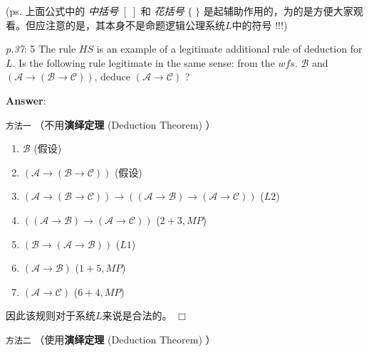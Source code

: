 \documentclass[UTF8,12pt,a4paper]{ctexart}
\begin{document}
\vspace{1em}

(ps. 上面公式中的 \textit{中括号} $[ \;]$ 和 \textit{花括号} $\{ \; \}$ 是起辅助作用的，为的是方便大家观看。但应注意的是，其本身不是命题逻辑公理系统$L$中的符号 !!!)

\vspace{2em}

\emph{p.37}: 5 \quad
The rule $HS$ is an example of a legitimate additional rule of deduction for $L$. Is the following rule legitimate in the same sense: from the $wfs.$ $\mathscr{B}$ and $(\mathscr{A} \to (\mathscr{B} \to \mathscr{C}))$, deduce $(\mathscr{A} \to \mathscr{C})$ ?

\noindent\textbf{Answer}:   

\noindent\texttt{方法一} （不用\textbf{演绎定理}  (Deduction Theorem) ）

\begin{enumerate}
	\item $\mathscr{B}$
	\hfill (假设)
	
	\item $(\mathscr{A} \to (\mathscr{B} \to \mathscr{C}))$
	\hfill (假设)
	
	
	\item $(\mathscr{A} \to (\mathscr{B} \to \mathscr{C})) \to ((\mathscr{A} \to \mathscr{B}) \to (\mathscr{A} \to \mathscr{C})) $
	\hfill ($L2$)
	
	
	\item $( (\mathscr{A} \to \mathscr{B}) \to (\mathscr{A} \to \mathscr{C}) )$
	\hfill ($2 + 3, MP$)
	
	\item $(\mathscr{B} \to (\mathscr{A} \to \mathscr{B}))$
	\hfill ($L1$)
	
	\item $(\mathscr{A} \to \mathscr{B})$
	\hfill ($1+5, MP$)
	
	\item $(\mathscr{A} \to \mathscr{C})$
	\hfill ($6+4, MP$)
\end{enumerate}

因此该规则对于系统$L$来说是合法的。
\hfill $\Box$



\vspace{2em}
\noindent\texttt{方法二} （使用\textbf{演绎定理}  (Deduction Theorem) ）
\end{document}
